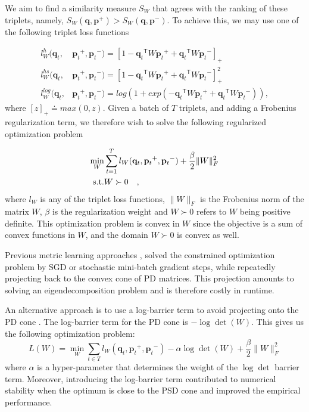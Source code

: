 \documentclass{article} %
\newcommand\mat[1]{{#1}}
\renewcommand\vec[1]{\mathbf{#1}}
\newcommand{\T}{{}^\mathsf{T}}
\newcommand{\W}{\mat{W}}
\newcommand{\eqdef}{\doteq}
\newcommand{\frobsq}[1]{{\|#1\|_F^2}}
\newcommand{\frob}[1]{{\|#1\|_F}}
\newcommand{\q}{{\vec{q}}}
\newcommand{\p}{{\vec{p}}}
\newcommand{\trip}{{t}}
\newcommand{\qt}{{\q_{\trip}}}
\newcommand{\pt}{{\p_{\trip}}}
\begin{document}
We aim to find a similarity measure $S_{\W}$ that agrees with the ranking of these triplets, namely, $S_{\W}(\q, \p^{+}) > S_{\W}(\q,
\p^{-})$. To achieve this, we may use one of the following triplet loss functions

\begin{align}
\label{single-triplet-lossed}
l_{\W}^h(\qt, &\pt^{+}, \pt^{-}) = [1-\qt\T\W\pt^+ + \qt\T\W\pt^-]_{+}
 \\ \nonumber
l_{\W}^{hs}(\qt, &\pt^+, \pt^-) = [1-\qt\T\W\pt^+ + \qt\T\W\pt^-]_{+}^2
 \\ \nonumber
l_{\W}^{log}(\qt, &\pt^+, \pt^-) = log(1+exp(-\qt\T\W\pt^+ + \qt\T\W\pt^-)) \nonumber ,
\end{align}
where $[z]_{+} \eqdef max(0,z)$. Given a batch of $T$ triplets, and adding a Frobenius regularization term, we therefore wish to solve the following regularized optimization problem

\begin{eqnarray}
  \min_{\W}& \sum_{\trip=1}^T  l_{\W}(\qt, \pt^+, \pt^-) + \frac{\beta}{2} \frobsq{\W}
 \\  \nonumber
   \rm{s.t.}& \W \succ 0 \quad,
\label{hingelt}
\end{eqnarray}
where $l_{\W}$ is any of the triplet loss functions, $\frob{\W}$ is the Frobenius norm of the matrix $\W$, $\beta$ is the regularization weight and $\W \succ 0$ refers to $\W$ being positive definite. This optimization problem is convex in $\W$ since the objective is a sum of convex functions in $\W$, and the domain $\W \succ 0$ is convex as well.

Previous metric learning approaches \cite{OASIS, qianHD, qian}, solved the constrained optimization problem by SGD or stochastic mini-batch gradient steps, while repeatedly projecting back to the convex cone of PD matrices. This projection amounts to solving an eigendecomposition problem and is therefore costly in runtime.

An alternative approach is to use a log-barrier term to avoid projecting onto the PD cone \cite{davis2007information,lego}. The log-barrier term for the PD cone is $- \log \det (\W)$. This gives us the following optimization problem:
\begin{equation}
\label{eq-logdet-loss}
L(W) = 
  \min_{\W} \sum_{\trip \in T}  l_{\W}(\qt, \pt^+, \pt^-) - \alpha \log \det(\W) + \frac{\beta}{2} \frobsq{\W}
\end{equation}
where $\alpha$ is a hyper-parameter that determines the weight of the
$\log \det$ barrier term. Moreover, introducing the log-barrier term contributed to numerical stability when the optimum is close to the PSD cone and improved the empirical performance.
\end{document}
